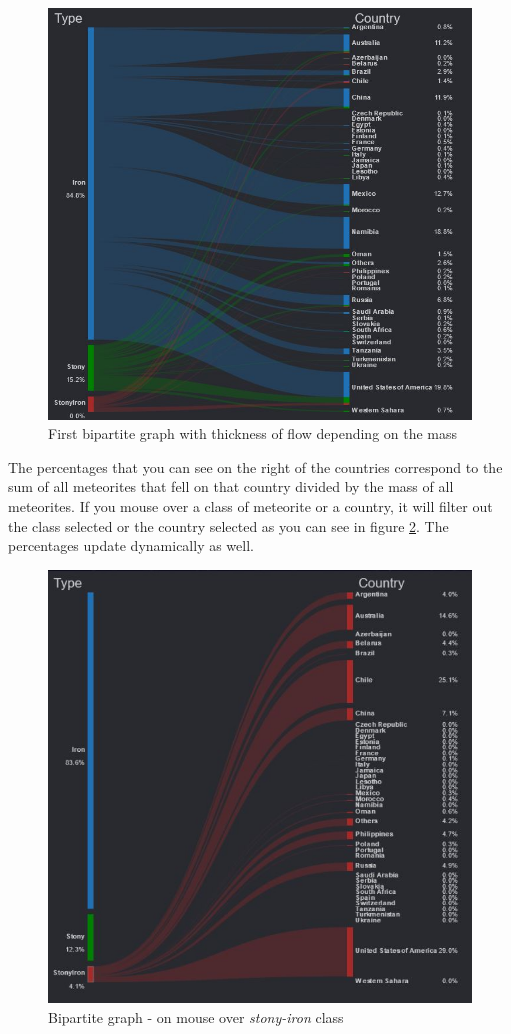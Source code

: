 \documentclass[10pt,conference,compsocconf]{IEEEtran}
\begin{document}
\begin{figure}[]
  \centering
  \includegraphics[width=0.7\columnwidth]{images/bipartite_mass}
  \vspace{3mm}
  \caption{First bipartite graph with thickness of flow depending on the mass}
  \label{fig:bipartite_mass}
\end{figure}

The percentages that you can see on the right of the countries correspond to the sum of all meteorites that fell on that country divided by the mass of all meteorites. If you mouse over a class of meteorite or a country, it will filter out the class selected or the country selected as you can see in figure \ref{fig:bipartite_mouse}. The percentages update dynamically as well.

\begin{figure}[]
  \centering
  \includegraphics[width=0.7\columnwidth]{images/example_mouse_bipartite}
  \vspace{3mm}
  \caption{Bipartite graph - on mouse over \textit{stony-iron} class}
  \label{fig:bipartite_mouse}
\end{figure}
\end{document}
